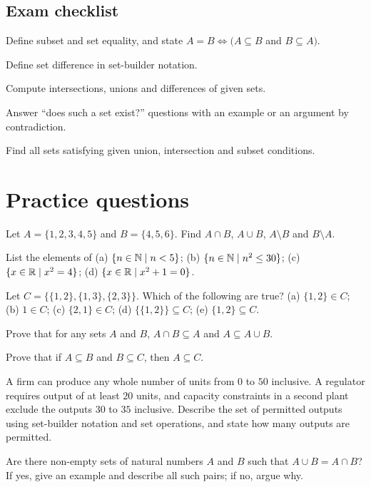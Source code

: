 \subsection*{Exam checklist}
\begin{checklist}
  \item Define subset and set equality, and state $A=B\Leftrightarrow(A\subseteq B$ and $B\subseteq A)$.
  \item Define set difference in set-builder notation.
  \item Compute intersections, unions and differences of given sets.
  \item Answer ``does such a set exist?'' questions with an example or an argument by contradiction.
  \item Find all sets satisfying given union, intersection and subset conditions.
\end{checklist}

\section{Practice questions}
\pq[basic] Let $A=\{1,2,3,4,5\}$ and $B=\{4,5,6\}$. Find $A\cap B$, $A\cup B$, $A\setminus B$ and $B\setminus A$.

\pq[basic] List the elements of (a) $\{n\in\mathbb{N}\mid n<5\}$; (b) $\{n\in\mathbb{N}\mid n^2\le 30\}$;
(c) $\{x\in\mathbb{R}\mid x^2=4\}$; (d) $\{x\in\mathbb{R}\mid x^2+1=0\}$.

\pq[conceptual] Let $C=\{\{1,2\},\{1,3\},\{2,3\}\}$. Which of the following are true?
(a) $\{1,2\}\in C$; (b) $1\in C$; (c) $\{2,1\}\in C$; (d) $\{\{1,2\}\}\subseteq C$; (e) $\{1,2\}\subseteq C$.

\pq[mathematical] Prove that for any sets $A$ and $B$, $A\cap B\subseteq A$ and $A\subseteq A\cup B$.

\pq[mathematical] Prove that if $A\subseteq B$ and $B\subseteq C$, then $A\subseteq C$.

\pq[application] A firm can produce any whole number of units from $0$ to $50$ inclusive. A regulator
requires output of at least $20$ units, and capacity constraints in a second plant exclude the outputs
$30$ to $35$ inclusive. Describe the set of permitted outputs using set-builder notation and set operations,
and state how many outputs are permitted.

 Are there non-empty sets of natural numbers $A$ and $B$ such that $A\cup B=A\cap B$? If yes,
give an example and describe all such pairs; if no, argue why.

